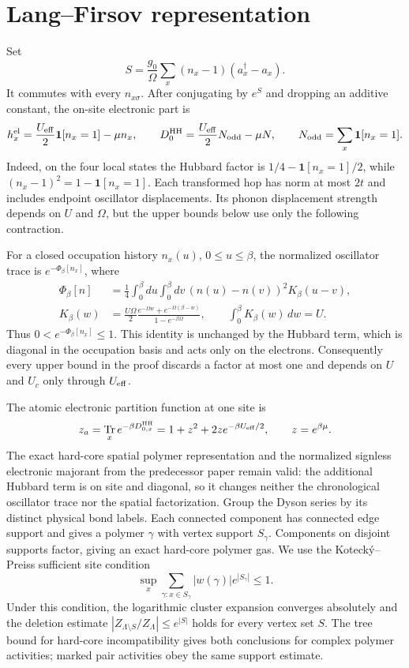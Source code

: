 \documentclass[11pt]{article}
\DeclareMathOperator{\Tr}{Tr}
\begin{document}
\section{Lang–Firsov representation}

Set
\[
 S=\frac{g_0}{\Omega}\sum_x(n_x-1)(a_x^\dagger-a_x).
\]
It commutes with every $n_{x\sigma}$. After conjugating by $e^S$ and dropping an additive constant, the on-site electronic part is
\[
 h_x^{\rm el}=\frac{U_{\rm eff}}2\mathbf 1[n_x=1]-\mu n_x,
 \qquad
 D_0^{\rm HH}=\frac{U_{\rm eff}}2N_{\rm odd}-\mu N,
 \qquad
 N_{\rm odd}=\sum_x\mathbf 1[n_x=1].
\]
Indeed, on the four local states the Hubbard factor is $1/4-\mathbf 1[n_x=1]/2$, while $(n_x-1)^2=1-\mathbf 1[n_x=1]$. Each transformed hop has norm at most $2t$ and includes endpoint oscillator displacements. Its phonon displacement strength depends on $U$ and $\Omega$, but the upper bounds below use only the following contraction.

For a closed occupation history $n_x(u)$, $0\le u\le\beta$, the normalized oscillator trace is $e^{-\Phi_\beta[n_x]}$, where
\begin{align*}
 \Phi_\beta[n]&=\frac14\int_0^\beta\!du\int_0^\beta\!dv\,
       (n(u)-n(v))^2K_\beta(u-v),\\
 K_\beta(w)&=\frac{U\Omega}{2}
       \frac{e^{-\Omega w}+e^{-\Omega(\beta-w)}}{1-e^{-\beta\Omega}},
 \qquad \int_0^\beta K_\beta(w)\,dw=U.
\end{align*}
Thus $0<e^{-\Phi_\beta[n_x]}\le1$. This identity is unchanged by the Hubbard term, which is diagonal in the occupation basis and acts only on the electrons. Consequently every upper bound in the proof discards a factor at most one and depends on $U$ and $U_c$ only through $U_{\rm eff}$.

The atomic electronic partition function at one site is
\[
 z_a=\Tr_x e^{-\beta D_{0,x}^{\rm HH}}
 =1+z^2+2z e^{-\beta U_{\rm eff}/2},
 \qquad z=e^{\beta\mu}.
\]
The exact hard-core spatial polymer representation and the normalized signless electronic majorant from the predecessor paper remain valid: the additional Hubbard term is on site and diagonal, so it changes neither the chronological oscillator trace nor the spatial factorization.
Group the Dyson series by its distinct physical bond labels. Each connected component has connected edge support and gives a polymer $\gamma$ with vertex support $S_\gamma$. Components on disjoint supports factor, giving an exact hard-core polymer gas. We use the Kotecký–Preiss sufficient site condition \cite{kp}
\[
 \sup_x\sum_{\gamma:x\in S_\gamma}|w(\gamma)|e^{|S_\gamma|}\le1.
\]
Under this condition, the logarithmic cluster expansion converges absolutely and the deletion estimate $|Z_{\Lambda\setminus S}/Z_\Lambda|\le e^{|S|}$ holds for every vertex set $S$. The tree bound for hard-core incompatibility gives both conclusions for complex polymer activities; marked pair activities obey the same support estimate.
\end{document}
